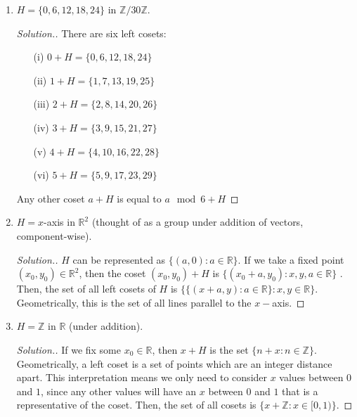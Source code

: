 \documentclass{article}
\newcommand{\Z}{\mathbb{Z}}
\newcommand{\R}{\mathbb{R}}
\begin{document}
\begin{enumerate}
\begin{enumerate}
        \item $H = \{0, 6, 12, 18, 24\}$ in $\Z/30\Z$.
            \begin{proof}[Solution.]
            There are six left cosets:
            \begin{enumerate}
                \item[(i)] $0 + H = \{0, 6, 12, 18, 24\}$
                \item[(ii)] $1 + H = \{1, 7, 13, 19, 25\}$
                \item[(iii)] $2 + H = \{2, 8, 14, 20, 26\}$
                \item[(iv)] $3 + H = \{3, 9, 15, 21, 27\}$
                \item[(v)] $4 + H = \{4, 10, 16, 22, 28\}$
                \item[(vi)] $5 + H = \{5, 9, 17, 23, 29\}$
            \end{enumerate}
            Any other coset $a + H$ is equal to $a \mod 6 + H$
            \end{proof}
        
        \item $H = x$-axis in $\R^2$ (thought of as a group under addition of vectors, component-wise).
        \begin{proof}[Solution.]
            $H$ can be represented as $\{(a, 0) : a \in \R\}$. If we take a fixed point $(x_0, y_0) \in \R^2$, then the coset $(x_0, y_0) + H$ is $\{(x_0 + a, y_0) : x, y, a \in \R\}$ . Then, the set of all left cosets of $H$ is $\{\{(x + a, y) : a \in \R\} : x, y \in \R\}$. Geometrically, this is the set of all lines parallel to the $x-$axis.
        \end{proof}
        
        \item $H = \Z$ in $\R$ (under addition).
        \begin{proof}[Solution.]
            If we fix some $x_0 \in \R$, then $x + H$ is the set $\{n + x : n \in \Z\}$. Geometrically, a left coset is a set of points which are an integer distance apart. This interpretation means we only need to consider $x$ values between $0$ and $1$, since any other values will have an $x$ between $0$ and $1$ that is a representative of the coset. Then, the set of all cosets is $\{x + \Z : x \in [0, 1)\}$.
        \end{proof}
    \end{enumerate}

    



\end{enumerate}
\end{document}
